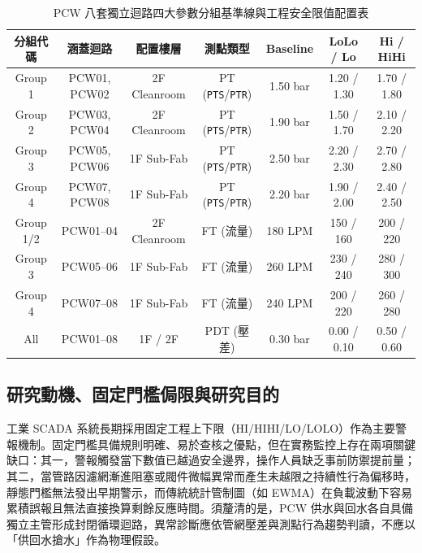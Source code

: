 \documentclass[fontset=none, a4paper, 12pt]{ctexart}
\begin{document}
\begin{doublespace}
\begin{table}[H]
\centering
\caption{PCW 八套獨立迴路四大參數分組基準線與工程安全限值配置表}
\label{tab:pcw_groups_v2}
\footnotesize
\renewcommand{\arraystretch}{1.15}
\setlength{\tabcolsep}{5pt}
\begin{tabularx}{0.98\textwidth}{ccccccc}
\toprule
\textbf{分組代碼} & \textbf{涵蓋迴路} & \textbf{配置樓層} & \textbf{測點類型} & \textbf{Baseline} & \textbf{LoLo / Lo} & \textbf{Hi / HiHi} \\
\midrule
Group 1 & PCW01, PCW02 & 2F Cleanroom & PT (\texttt{PTS}/\texttt{PTR}) & 1.50 bar & 1.20 / 1.30 & 1.70 / 1.80 \\
Group 2 & PCW03, PCW04 & 2F Cleanroom & PT (\texttt{PTS}/\texttt{PTR}) & 1.90 bar & 1.50 / 1.70 & 2.10 / 2.20 \\
Group 3 & PCW05, PCW06 & 1F Sub-Fab   & PT (\texttt{PTS}/\texttt{PTR}) & 2.50 bar & 2.20 / 2.30 & 2.70 / 2.80 \\
Group 4 & PCW07, PCW08 & 1F Sub-Fab   & PT (\texttt{PTS}/\texttt{PTR}) & 2.20 bar & 1.90 / 2.00 & 2.40 / 2.50 \\
\midrule
Group 1/2 & PCW01–04 & 2F Cleanroom & FT (流量) & 180 LPM & 150 / 160 & 200 / 220 \\
Group 3   & PCW05–06 & 1F Sub-Fab   & FT (流量) & 260 LPM & 230 / 240 & 280 / 300 \\
Group 4   & PCW07–08 & 1F Sub-Fab   & FT (流量) & 240 LPM & 200 / 220 & 260 / 280 \\
All       & PCW01–08 & 1F / 2F      & PDT (壓差) & 0.30 bar & 0.00 / 0.10 & 0.50 / 0.60 \\
\bottomrule
\end{tabularx}
\end{table}

\subsection{研究動機、固定門檻侷限與研究目的}
工業 SCADA 系統長期採用固定工程上下限（HI/HIHI/LO/LOLO）作為主要警報機制。固定門檻具備規則明確、易於查核之優點，但在實務監控上存在兩項關鍵缺口：其一，警報觸發當下數值已越過安全邊界，操作人員缺乏事前防禦提前量；其二，當管路因濾網漸進阻塞或閥件微幅異常而產生未越限之持續性行為偏移時，靜態門檻無法發出早期警示，而傳統統計管制圖（如 EWMA）在負載波動下容易累積誤報且無法直接換算剩餘反應時間。須釐清的是，PCW 供水與回水各自具備獨立主管形成封閉循環迴路，異常診斷應依管網壓差與測點行為趨勢判讀，不應以「供回水搶水」作為物理假設。


\end{doublespace}
\end{document}
